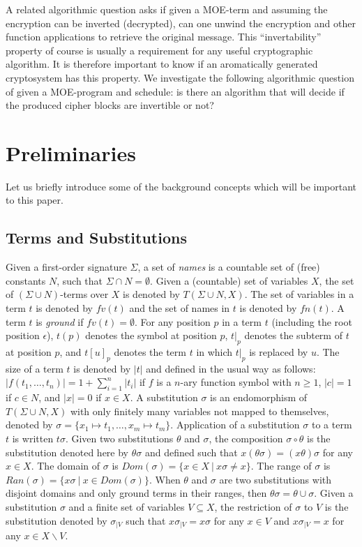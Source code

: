 \documentclass{easychair}
\begin{document}
A related algorithmic question asks if given a MOE-term and assuming
the encryption can be inverted (decrypted), can one unwind the 
encryption and other function applications to retrieve the 
original message. This ``invertability'' property of course 
is usually a requirement for any useful cryptographic algorithm.
It is therefore important to know if an aromatically generated cryptosystem has this property. We investigate the following algorithmic 
question of given a MOE-program and schedule: is there an algorithm that will decide if the produced cipher blocks are invertible or not?
   
 
\section{Preliminaries}
Let us briefly introduce some of the background concepts which will be important to this paper. 
\subsection{Terms and Substitutions}
Given a first-order signature $\Sigma$, a set of {\em names} is a
countable set of (free) constants $N$, such that $\Sigma \cap N =
\emptyset$.  Given a (countable) set of variables $X$, the set of
$(\Sigma \cup N)$-terms over $X$ is denoted by $T(\Sigma \cup N,X)$.
The set of variables in a term $t$ is denoted by $fv(t)$ and the set
of names in $t$ is denoted by $fn(t)$.  A term $t$ is \emph{ground} if
$fv(t) = \emptyset$.  For any position $p$ in a term $t$ (including
the root position $\epsilon$), $t(p)$ denotes the symbol at position
$p$, $t|_p$ denotes the subterm of $t$ at position $p$, and $t[u]_p$
denotes the term $t$ in which $t|_p$ is replaced by $u$.
The size of a term $t$ is denoted by $|t|$ and defined in the usual
way as follows: $|f(t_1,\dots,t_n)| = 1 + \sum_{i=1}^n |t_i|$ if $f$
is a $n$-ary function symbol with $n\geq 1$, $|c| = 1$ if $c \in N$, and $|x| = 0$ if $x \in X$.
A substitution $\sigma$ is an endomorphism of $T(\Sigma \cup N,X)$ with only finitely many variables not mapped to themselves, denoted by
$\sigma= \{ x_1 \mapsto t_1, \dots, x_m \mapsto t_m \}$. 
Application of a substitution $\sigma$ to a term $t$ is written $t\sigma$.
Given two substitutions $\theta$ and $\sigma$, the composition $\sigma \circ \theta$ is the substitution denoted here by $\theta\sigma$ and defined such that $x(\theta\sigma) = (x\theta)\sigma$ for any $x \in X$. 
The domain of $\sigma$ is $Dom(\sigma) = \{ x \in X ~|~ x\sigma \neq x \}$. The range of $\sigma$ is $Ran(\sigma) = \{ x\sigma ~|~ x \in Dom(\sigma) \}$. When $\theta$ and $\sigma$ are two substitutions with disjoint domains and only ground terms in their ranges, then $\theta\sigma = \theta \cup \sigma$.
Given a substitution $\sigma$ and a finite set of variables $V \subseteq X$, the restriction of $\sigma$ to $V$ is the substitution denoted by $\sigma_{| V}$ such that $x\sigma_{| V} = x \sigma$ for any $x \in V$ and $x\sigma_{| V} = x$ for any $x \in X \backslash V$.
\end{document}

